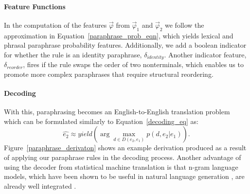 \documentclass[11pt]{article}
\begin{document}
\paragraph{Feature Functions}

In the computation of the features $\vec{\varphi}$ from
$\vec{\varphi}_1$ and $\vec{\varphi}_2$ we follow the approximation in
Equation~\ref{paraphrase_prob_eqn}, which yields lexical and phrasal
paraphrase probability features. Additionally, we add a boolean
indicator for whether the rule is an identity paraphrase,
$\delta_{\mathit{identity}}$. Another indicator feature,
$\delta_{\mathit{reorder}}$, fires if the rule swaps the order of two
nonterminals, which enables us to promote more complex paraphrases
that require structural reordering.


\paragraph{Decoding}

With this, paraphrasing becomes an English-to-English translation
problem which can be formulated similarly to
Equation~\ref{decoding_eq} as: 
\begin{equation*}
\hat{e_2} \approx \mathit{yield}(\arg \max_{d\in
  D(e_2,e_1)}{p(d,e_2|e_1)}).
  \end{equation*}
 Figure~\ref{paraphrase_derivaton}
shows an example derivation produced as a result of applying our
paraphrase rules in the decoding process. Another advantage of using
the decoder from statistical machine translation is that n-gram
language models, which have been shown to be useful in natural
language generation \cite{Langkilde1998}, are already well integrated
\cite{Huang2007}.
\end{document}
